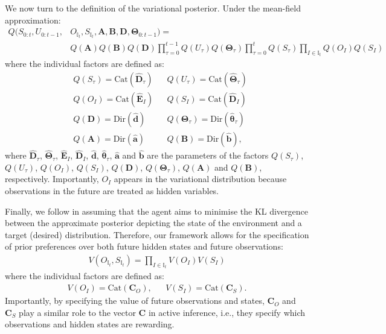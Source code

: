 \documentclass[twoside,11pt]{article}
\begin{document}
We now turn to the definition of the variational posterior. Under the mean-field approximation:
\vspace{-0.5cm}
\begin{equation}
\label{eq: mean field approx posterior}
\begin{split}
   Q(S_{0:t},U_{0:t-1},&O_{\mathbb{I}_t},S_{\mathbb{I}_t},\bm{A},\bm{B},\bm{D},\bm{\Theta}_{0:t-1}) = \\
&Q(\bm{A}) Q(\bm{B}) Q(\bm{D}) \prod_{\tau = 0}^{t - 1} Q(U_\tau) Q(\bm{\Theta}_\tau) \prod_{\tau = 0}^t Q(S_\tau) \prod_{I \in \mathbb{I}_t} Q(O_I)Q(S_I) 
\end{split}
\end{equation}
where the individual factors are defined as:
\begin{align*}
&Q(S_\tau) = \text{Cat}(\bm{\hat{D}}_\tau)& &Q(U_\tau) = \text{Cat}(\bm{\hat{\Theta}}_\tau) \\
&Q(O_I) = \text{Cat}(\bm{\hat{E}}_I)& &Q(S_I) = \text{Cat}(\bm{\hat{D}}_I)\\
&Q(\bm{D}) = \text{Dir}(\bm{\hat{d}}) & & Q(\bm{\Theta}_\tau) = \text{Dir}(\bm{\hat{\theta}}_\tau)\\
&Q(\bm{A}) = \text{Dir}(\bm{\hat{a}}) & & Q(\bm{B}) = \text{Dir}(\bm{\hat{b}}),
\end{align*}
where $\bm{\hat{D}}_\tau$, $\bm{\hat{\Theta}}_\tau$, $\bm{\hat{E}}_I$, $\bm{\hat{D}}_I$, $\bm{\hat{d}}$, $\bm{\hat{\theta}}_\tau$, $\bm{\hat{a}}$ and $\bm{\hat{b}}$ are the parameters of the factors $Q(S_\tau)$, $Q(U_\tau)$, $Q(O_I)$, $Q(S_I)$, $Q(\bm{D})$, $Q(\bm{\Theta}_\tau)$, $Q(\bm{A})$ and $Q(\bm{B})$, respectively. Importantly, $O_I$ appears in the variational distribution because observations in the future are treated as hidden variables.

Finally, we follow \citet{millidge2020expected} in assuming that the agent aims to minimise the KL divergence between the approximate posterior depicting the state of the environment and a target (desired) distribution. Therefore, our framework allows for the specification of prior preferences over both future hidden states and future observations:
\begin{align}
\label{eq: target distribution}
V(O_{\mathbb{I}_t},S_{\mathbb{I}_t}) = \prod_{I \in \mathbb{I}_t} V(O_I)V(S_I)
\end{align}
where the individual factors are defined as:
\begin{align}
V(O_I) = \text{Cat}(\bm{C}_O),& &V(S_I) = \text{Cat}(\bm{C}_S).
\end{align}
Importantly, by specifying the value of future observations and states, $\bm{C}_O$ and $\bm{C}_S$ play a similar role to the vector $\bm{C}$ in active inference, i.e., they specify which observations and hidden states are rewarding.
\end{document}
